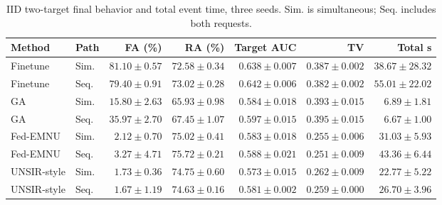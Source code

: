 \begin{table}[H]\centering\scriptsize\setlength{\tabcolsep}{3pt}

\caption{IID two-target final behavior and total event time, three seeds. Sim. is simultaneous; Seq. includes both requests.}

\label{tab:sequence-iid}

\begin{tabular}{llrrrrr}\toprule Method & Path & FA (\%) & RA (\%) & Target AUC & TV & Total s\\\midrule

Finetune & Sim. & $81.10 \pm 0.57$ & $72.58 \pm 0.34$ & $0.638 \pm 0.007$ & $0.387 \pm 0.002$ & $38.67 \pm 28.32$\\

Finetune & Seq. & $79.40 \pm 0.91$ & $73.02 \pm 0.28$ & $0.642 \pm 0.006$ & $0.382 \pm 0.002$ & $55.01 \pm 22.02$\\

GA & Sim. & $15.80 \pm 2.63$ & $65.93 \pm 0.98$ & $0.584 \pm 0.018$ & $0.393 \pm 0.015$ & $6.89 \pm 1.81$\\

GA & Seq. & $35.97 \pm 2.70$ & $67.45 \pm 1.07$ & $0.597 \pm 0.015$ & $0.395 \pm 0.015$ & $6.67 \pm 1.00$\\

Fed-EMNU & Sim. & $2.12 \pm 0.70$ & $75.02 \pm 0.41$ & $0.583 \pm 0.018$ & $0.255 \pm 0.006$ & $31.03 \pm 5.93$\\

Fed-EMNU & Seq. & $3.27 \pm 4.71$ & $75.72 \pm 0.21$ & $0.588 \pm 0.021$ & $0.251 \pm 0.009$ & $43.36 \pm 6.44$\\

UNSIR-style & Sim. & $1.73 \pm 0.36$ & $74.75 \pm 0.60$ & $0.573 \pm 0.015$ & $0.262 \pm 0.009$ & $22.77 \pm 5.22$\\

UNSIR-style & Seq. & $1.67 \pm 1.19$ & $74.63 \pm 0.16$ & $0.581 \pm 0.002$ & $0.259 \pm 0.000$ & $26.70 \pm 3.96$\\

\bottomrule\end{tabular}\end{table}

